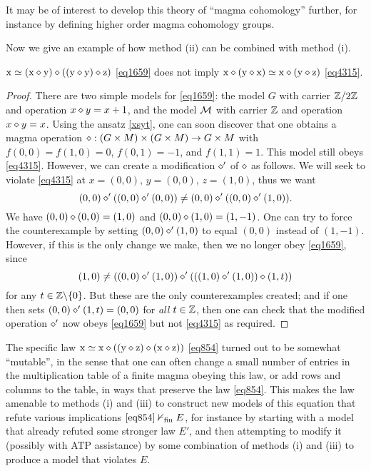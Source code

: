 It may be of interest to develop this theory of ``magma cohomology'' further, for instance by defining higher order magma cohomology groups.

Now we give an example of how method (ii) can be combined with method (i).

\begin{proposition}\label{1659-4315} $\mathrm{x} \simeq (\mathrm{x} \diamond \mathrm{y}) \diamond ((\mathrm{y} \diamond \mathrm{y}) \diamond \mathrm{z})$ \eqref{eq1659} does not imply $\mathrm{x} \diamond (\mathrm{y} \diamond \mathrm{x}) \simeq \mathrm{x} \diamond (\mathrm{y} \diamond \mathrm{z})$ \eqref{eq4315}.
\end{proposition}

\begin{proof}  There are two simple models for \eqref{eq1659}: the model $G$ with carrier $\mathbb{Z}/2\mathbb{Z}$ and operation $x \diamond y = x+1$, and the model ${\mathcal{M}}$ with carrier $\mathbb{Z}$ and operation $x \diamond y = x$.  Using the ansatz \eqref{xsyt}, one can soon discover that one obtains a magma operation $\diamond: (G \times M) \times (G \times M) \to G \times M$ with $f(0,0)=f(1,0)=0$, $f(0,1)=-1$, and $f(1,1)=1$.  This model still obeys \eqref{eq4315}. However, we can create a modification $\diamond'$ of $\diamond$ as follows.  We will seek to violate \eqref{eq4315} at $x = (0,0)$, $y = (0,0)$, $z = (1,0)$, thus we want
$$ (0,0) \diamond' ((0,0) \diamond' (0,0)) \neq (0,0) \diamond' ((0,0) \diamond' (1,0)).$$
We have $(0,0) \diamond (0,0) = (1,0)$ and $(0,0) \diamond (1,0) = (1,-1)$.  One can try to force the counterexample by setting $(0,0) \diamond' (1,0)$ to equal $(0,0)$ instead of $(1,-1)$. However, if this is the only change we make, then we no longer obey \eqref{eq1659}, since
$$ (1,0) \neq ((0,0) \diamond' (1,0)) \diamond' (((1,0) \diamond' (1,0)) \diamond (1,t))$$
for any $t \in \mathbb{Z} \backslash \{0\}$. But these are the only counterexamples created; and if one then sets $(0,0) \diamond' (1,t) = (0,0)$ for \emph{all} $t \in \mathbb{Z}$, then one can check that the modified operation $\diamond'$ now obeys \eqref{eq1659} but not \eqref{eq4315} as required.
\end{proof}

The specific law $\mathrm{x} \simeq \mathrm{x} \diamond ((\mathrm{y} \diamond \mathrm{z}) \diamond (\mathrm{x} \diamond \mathrm{z}))$ \eqref{eq854} turned out to be somewhat ``mutable'', in the sense that one can often change a small number
 of entries in the multiplication table of a finite magma obeying this law, or add rows and columns to the table,
 in ways that preserve the law \eqref{eq854}.  This makes the law amenable to methods (i) and (iii) to construct new models of this equation that
 refute various implications  $\eqref{eq854} \nvdash_{\mathrm{fin}} E$, for instance by starting with a model that already refuted some stronger law $E'$, and then attempting to modify it
 (possibly with ATP assistance) by some combination of methods (i) and (iii) to produce a model that violates $E$.

